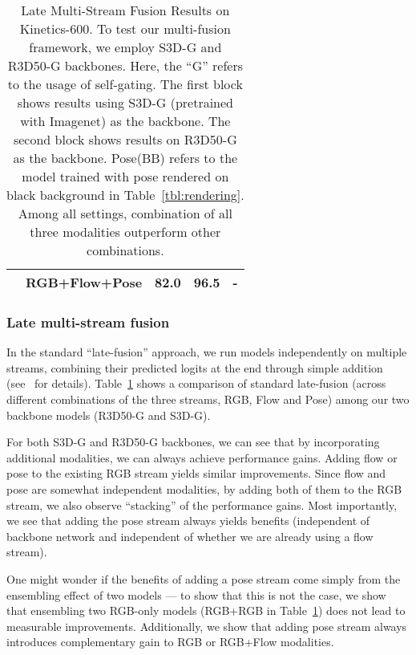 \documentclass[10pt,twocolumn,letterpaper]{article}
\begin{document}
\begin{table}[t!]
{\begin{tabular}{c | l | c | c | c }
& RGB+Flow+Pose & \textbf{82.0} & \textbf{96.5} & -    \\ 
\bottomrule [0.2em]
\end{tabular}
}
\vspace{0.2cm}
\centering
\caption{ Late Multi-Stream Fusion Results on Kinetics-600. To test our 
multi-fusion framework, we employ S3D-G and R3D50-G backbones.  Here, the ``G'' refers to the usage of self-gating. 
The first block shows results using S3D-G (pretrained with Imagenet) as the backbone. The second block shows results on R3D50-G as the backbone. Pose(BB) refers to the model trained with pose rendered on black background in Table~\ref{tbl:rendering}. Among all settings, combination of all three modalities outperform other combinations. }
\label{tab:main_results}
\end{table}



\subsubsection{Late multi-stream fusion}
In the standard ``late-fusion'' approach, we run models independently on multiple streams, combining their predicted logits at the end through simple 
addition (see~\cite{feichtenhofer2016convolutional} for details).
Table~\ref{tab:main_results} shows a comparison of standard late-fusion (across different combinations of the three streams, RGB, Flow and Pose) 
among our two backbone models (R3D50-G and S3D-G). 

For both  S3D-G and R3D50-G backbones, we can see that by incorporating additional modalities, we can always achieve performance gains. Adding flow or pose to the existing RGB stream yields similar improvements. Since flow and pose are somewhat independent modalities, by adding both of them to the RGB stream, we also observe ``stacking'' 
of the performance gains.  Most importantly, we see that adding the pose stream always yields benefits (independent of backbone network and independent of whether we are already using a flow stream). 



One might wonder if the benefits of adding a pose stream come simply from the ensembling effect of two models --- to show that this is not the case, we show that 
ensembling two RGB-only models (RGB+RGB in Table~\ref{tab:main_results}) does
not lead to measurable improvements. Additionally, we show that adding pose stream always introduces complementary gain to RGB or RGB+Flow modalities.
\end{document}
